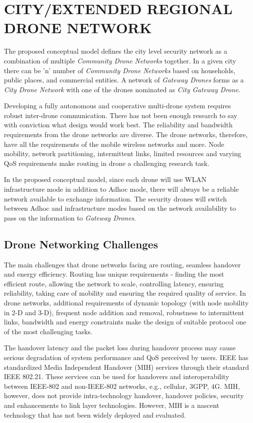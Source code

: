 \documentclass[sigconf]{acmart}
\begin{document}
\section{CITY/EXTENDED REGIONAL DRONE NETWORK}
The proposed conceptual model defines the city level security network as a combination of multiple \textit{Community Drone Networks} together. In a given city there can be 'n' number of \textit{Community Drone Networks} based on households, public places, and commercial entities. A network of \textit{Gateway Drones} forms as a \textit{City Drone Network} with one of the drones nominated as \textit{City Gateway Drone}.

Developing a fully autonomous and cooperative multi-drone system requires robust inter-drone communication. There has not been enough research to say with conviction what design would work best. The reliability and bandwidth requirements from the drone networks are diverse. The drone networks, therefore, have all the requirements of the mobile wireless networks and more. Node mobility, network partitioning, intermittent links, limited resources and varying QoS requirements make routing in drone a challenging research task\cite{Gupta2015}. 

In the proposed conceptual model, since each drone will use WLAN infrastructure mode in addition to Adhoc mode, there will always be a reliable network available to exchange  information. The security drones will switch between Adhoc and infrastructure modes based on the network availability to pass on the information to \textit{Gateway Drones}. 

\subsection{Drone Networking Challenges}
The main challenges that drone networks facing are routing, seamless handover and energy efficiency. 
Routing has unique requirements - finding the most efficient route, allowing the network to scale, controlling latency, ensuring reliability, taking care of mobility and ensuring the required quality of service. In drone networks, additional requirements of dynamic topology (with node mobility in 2-D and 3-D), frequent node addition and removal, robustness to intermittent links, bandwidth and energy constraints make the design of suitable protocol one of the most challenging tasks\cite{Gupta2015}. 

The handover latency and the packet loss during handover process may cause serious degradation of system performance and QoS perceived by users. IEEE has standardized Media Independent Handover (MIH) services through their standard IEEE 802.21. These services can be used for handovers and interoperability between IEEE-802 and non-IEEE-802 networks, e.g., cellular, 3GPP, 4G. MIH, however, does not provide intra-technology handover, handover policies, security and enhancements to link layer technologies. However, MIH is a nascent technology that has not been widely deployed and evaluated\cite{Gupta2015}.
\end{document}
